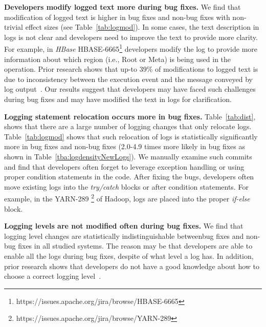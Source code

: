  
\textbf{Developers modify logged text more during bug fixes.} We find that modification of logged text is higher in bug fixes and non-bug fixes with non-trivial effect sizes (see Table~\ref{tab:logmod}). In some cases, the text description in logs is not clear and developers need to improve the text to provide more clarity. For example, in \emph{HBase} HBASE-6665\footnote{https://issues.apache.org/jira/browse/HBASE-6665} developers modify the log to provide more information about which region (i.e., Root or Meta) is being used in the operation. Prior research shows that up-to 39\% of modifications to logged text is due to inconsistency between the execution event and the message conveyed by log output~\cite{Characterizinglogs}. Our results suggest that developers may have faced such challenges during bug fixes and may have modified the text in logs for clarification. 


\textbf{Logging statement relocation occurs more in bug fixes.} Table~\ref{tab:dist}, shows that there are a large number of logging changes that only relocate logs. Table~\ref{tab:logmod} shows that such relocation of logs is statistically significantly more in bug fixes and non-bug fixes (2.0-4.9 times more likely in bug fixes as shown in Table~\ref{tba:logdensityNewLogs}). We manually examine such commits and find that developers often forget to leverage exception handling or using proper condition statements in the code. After fixing the bugs, developers often move existing logs into the \emph{try/catch} blocks or after condition statements. For example, in the YARN-289 \footnote{https://issues.apache.org/jira/browse/YARN-289} of Hadoop, logs are placed into the proper \emph{if-else} block.

\textbf{Logging levels are not modified often during bug fixes.} We find that logging level changes are statistically indistinguishable betweenbug fixes and non-bug fixes in all studied systems. The reason may be that developers are able to enable all the logs during bug fixes, despite of what level a log has. In addition, prior research shows that developers do not have a good knowledge about how to choose a correct logging level~\cite{Characterizinglogs}. 



